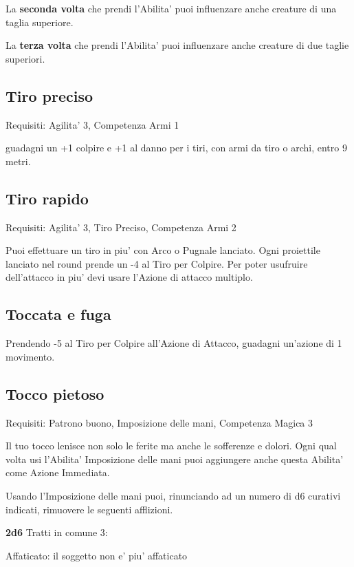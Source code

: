 \documentclass[a4paper,11pt,twoside,openany]{dndbook}
\begin{document}
La \textbf{seconda volta} che prendi l'Abilita' puoi influenzare anche creature di una taglia superiore.

La \textbf{terza volta} che prendi l'Abilita' puoi influenzare anche creature di due taglie superiori.

\subsection{Tiro preciso}

Requisiti: Agilita' 3, Competenza Armi 1

guadagni un +1 colpire e +1 al danno per i tiri, con armi da tiro o archi, entro 9 metri.

\subsection{Tiro rapido}

Requisiti: Agilita' 3, Tiro Preciso, Competenza Armi 2

Puoi effettuare un tiro in piu' con Arco o Pugnale lanciato. Ogni
proiettile lanciato nel round prende un -4 al Tiro per Colpire. Per
poter usufruire dell'attacco in piu' devi usare l'Azione di attacco
multiplo.

\subsection{Toccata e fuga}

Prendendo -5 al Tiro per Colpire all'Azione di Attacco, guadagni un'azione di 1 movimento.

\subsection{Tocco pietoso}

Requisiti: Patrono buono, Imposizione delle mani, Competenza Magica 3

Il tuo tocco lenisce non solo le ferite ma anche le sofferenze e dolori. Ogni qual volta usi l'Abilita' Imposizione delle mani puoi aggiungere anche questa Abilita' come Azione Immediata.

Usando l'Imposizione delle mani puoi, rinunciando ad un numero di d6 curativi indicati, rimuovere le seguenti afflizioni.

\textbf{2d6} Tratti in comune 3:

Affaticato: il soggetto non e' piu' affaticato
\end{document}
